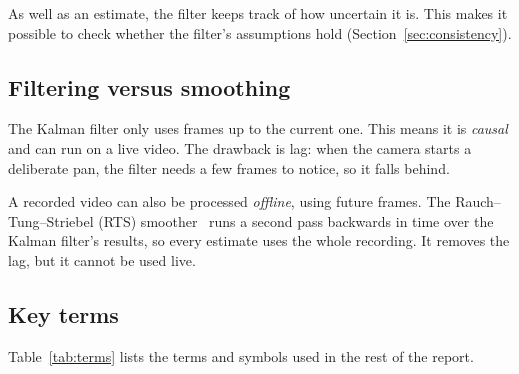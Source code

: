 \documentclass[11pt,a4paper]{article}
\begin{document}
As well as an estimate, the filter keeps track of how uncertain it is. This makes it possible
to check whether the filter's assumptions hold (Section~\ref{sec:consistency}).

\subsection{Filtering versus smoothing}
The Kalman filter only uses frames up to the current one. This means it is \emph{causal} and
can run on a live video. The drawback is lag: when the camera starts a deliberate pan, the
filter needs a few frames to notice, so it falls behind.

A recorded video can also be processed \emph{offline}, using future frames. The
Rauch--Tung--Striebel (RTS) smoother~\cite{rts1965} runs a second pass backwards in time over
the Kalman filter's results, so every estimate uses the whole recording. It removes the lag,
but it cannot be used live.

\subsection{Key terms}
Table~\ref{tab:terms} lists the terms and symbols used in the rest of the report.
\end{document}
